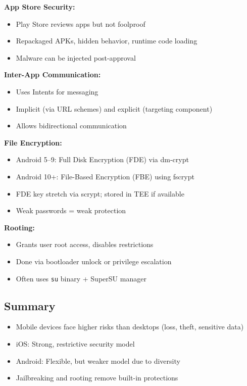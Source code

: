{\textbf{App Store Security:}
\begin{itemize}[noitemsep]
  \item Play Store reviews apps but not foolproof
  \item Repackaged APKs, hidden behavior, runtime code loading
  \item Malware can be injected post-approval
\end{itemize}

\textbf{Inter-App Communication:}
\begin{itemize}[noitemsep]
  \item Uses Intents for messaging
  \item Implicit (via URL schemes) and explicit (targeting component)
  \item Allows bidirectional communication
\end{itemize}

\textbf{File Encryption:}
\begin{itemize}[noitemsep]
  \item Android 5–9: Full Disk Encryption (FDE) via dm-crypt
  \item Android 10+: File-Based Encryption (FBE) using fscrypt
  \item FDE key stretch via scrypt; stored in TEE if available
  \item Weak passwords = weak protection
\end{itemize}

\textbf{Rooting:}
\begin{itemize}[noitemsep]
  \item Grants user root access, disables restrictions
  \item Done via bootloader unlock or privilege escalation
  \item Often uses \texttt{su} binary + SuperSU manager
\end{itemize}
}

\subsection{Summary}
{
\begin{itemize}[noitemsep]
  \item Mobile devices face higher risks than desktops (loss, theft, sensitive data)
  \item iOS: Strong, restrictive security model
  \item Android: Flexible, but weaker model due to diversity
  \item Jailbreaking and rooting remove built-in protections
\end{itemize}
}
